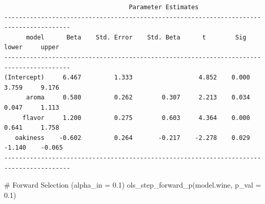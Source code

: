 \documentclass[
  letterpaper,
]{scrbook}
\newenvironment{Shaded}{\begin{snugshade}}{\end{snugshade}}
\newcommand{\AttributeTok}[1]{\textcolor[rgb]{0.40,0.45,0.13}{#1}}
\newcommand{\CommentTok}[1]{\textcolor[rgb]{0.37,0.37,0.37}{#1}}
\newcommand{\FloatTok}[1]{\textcolor[rgb]{0.68,0.00,0.00}{#1}}
\newcommand{\FunctionTok}[1]{\textcolor[rgb]{0.28,0.35,0.67}{#1}}
\newcommand{\NormalTok}[1]{\textcolor[rgb]{0.00,0.23,0.31}{#1}}
\begin{document}
\begin{verbatim}
                                  Parameter Estimates                                    
----------------------------------------------------------------------------------------
      model      Beta    Std. Error    Std. Beta      t        Sig      lower     upper 
----------------------------------------------------------------------------------------
(Intercept)     6.467         1.333                  4.852    0.000     3.759     9.176 
      aroma     0.580         0.262        0.307     2.213    0.034     0.047     1.113 
     flavor     1.200         0.275        0.603     4.364    0.000     0.641     1.758 
   oakiness    -0.602         0.264       -0.217    -2.278    0.029    -1.140    -0.065 
----------------------------------------------------------------------------------------
\end{verbatim}

\begin{Shaded}
\begin{Highlighting}[]
\CommentTok{\# Forward Selection (alpha\_in = 0.1)}
\FunctionTok{ols\_step\_forward\_p}\NormalTok{(model.wine, }\AttributeTok{p\_val =} \FloatTok{0.1}\NormalTok{)}
\end{Highlighting}
\end{Shaded}
\end{document}
